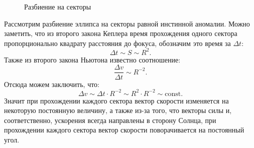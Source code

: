 \begin{wrapfigure}[10]{r}{0.4\tw}
    \caption{Разбиение на секторы}
    \label{pic:hodograph1}
\end{wrapfigure}
Рассмотрим разбиение эллипса на секторы равной инстинной аномалии. Можно заметить, что из второго закона Кеплера время прохождения одного сектора пропорционально квадрату расстояния до фокуса, обозначим это время за $\Delta t$:
\begin{equation*}
    \Delta t \sim S \sim R^2.
\end{equation*}
Также из второго закона Ньютона известно соотношение:
\begin{equation*}
    \frac{\Delta v}{\Delta t} \sim R^{-2}.
\end{equation*}
Отсюда можем заключить, что:
\begin{equation*}
    \Delta v \sim \Delta t \cdot R^{-2} \sim  R^2 \cdot R^{-2} \sim \text{const}.
\end{equation*}
Значит при прохождении каждого сектора вектор скорости изменяется на некоторую постоянную величину, а также из-за того, что векторы силы и, соответственно, ускорения всегда направлены в сторону Солнца, при прохождении каждого сектора вектор скорости поворачивается на постоянный угол.

